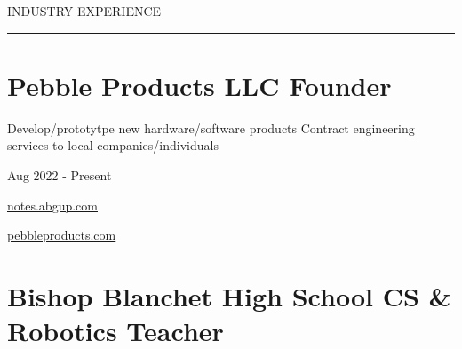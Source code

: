 
\vspace{1ex}

{\hspace{-1.72in}\noindent\color{cblue} INDUSTRY EXPERIENCE }

\vspace{5ex}

\vspace{-6.5ex}
{\hspace{-1.73in}\noindent\color{dblue}\rule{6.935in}{0.4pt}} %
\vspace{0.4ex}


\section
{\textbf{Pebble Products LLC} \newline
Founder}{}

\vspace{-2.0ex}
\begin{detail}
    \BulletItem
    Develop/prototytpe new hardware/software products
    \BulletItem
    Contract engineering services to local companies/individuals
\end{detail}

\begin{subtitle}
    \vspace{-8.5ex}
    {{Aug 2022 - Present}}
\end{subtitle}

{\vspace{1.0ex} \color{blue} \small \href{https://notes.abgup.com}{notes.abgup.com}}

{\vspace{-2.5ex} \hspace{3.17in} \color{blue} \small \href{https://pebbleproducts.com}{pebbleproducts.com} }
\vspace{2.5ex}


\section
{\textbf{Bishop Blanchet High School} \newline
CS \& Robotics Teacher}{}

